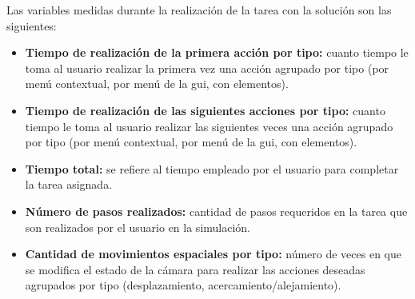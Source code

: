 Las variables medidas durante la realización de la tarea con la solución son las
siguientes:


\begin{itemize}

\item \textbf{Tiempo de realización de la primera acción por tipo:} cuanto tiempo 
	le toma al usuario realizar la primera vez una acción agrupado por tipo (por menú 
	contextual, por menú de la \Gls{gui}, con elementos).

%
%    

\item \textbf{Tiempo de realización de las siguientes acciones por tipo:} cuanto tiempo 
	le toma al usuario realizar las siguientes veces una acción agrupado por 
	tipo (por menú contextual, por menú de la \Gls{gui}, con elementos).
 
%
%

\item \textbf{Tiempo total:} se refiere al tiempo empleado por el usuario para 
    completar la tarea asignada.

\item \textbf{Número de pasos realizados:} cantidad de pasos requeridos en la tarea 
    que son realizados por el usuario en la simulación. 

\item \textbf{Cantidad de movimientos espaciales por tipo:} número de veces en que se 
    modifica el estado de la cámara para realizar las acciones deseadas agrupados por 
    tipo (desplazamiento, acercamiento/alejamiento).


\end{itemize}

